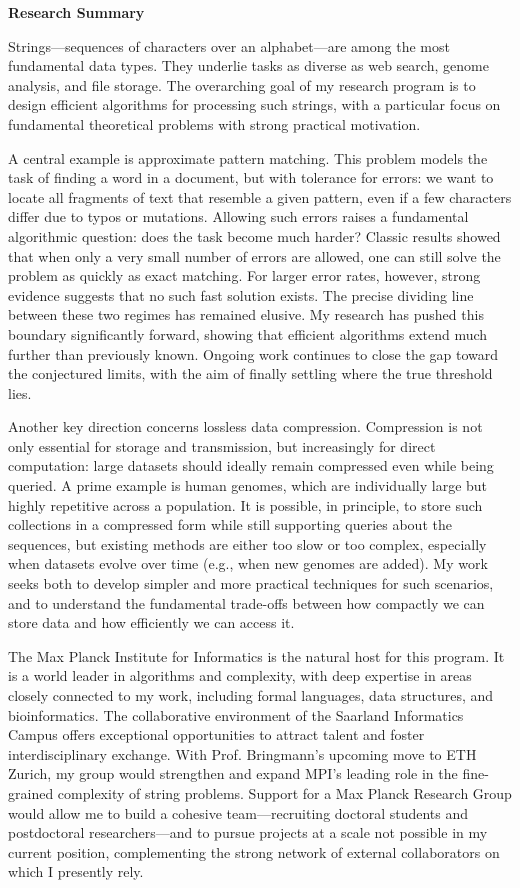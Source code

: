 \documentclass[a4paper,11pt]{article}
\begin{document}
\thispagestyle{firststyle}
\begin{center}
{\bfseries {Research Summary}}
\end{center}\vspace{-.25cm}

Strings—sequences of characters over an alphabet—are among the most fundamental data types. They underlie tasks as diverse as web search, genome analysis, and file storage. The overarching goal of my research program is to design efficient algorithms for processing such strings, with a particular focus on fundamental theoretical problems with strong practical motivation.

A central example is approximate pattern matching. This problem models the task of finding a word in a document, but with tolerance for errors: we want to locate all fragments of text that resemble a given pattern, even if a few characters differ due to typos or mutations. Allowing such errors raises a fundamental algorithmic question: does the task become much harder? Classic results showed that when only a very small number of errors are allowed, one can still solve the problem as quickly as exact matching. For larger error rates, however, strong evidence suggests that no such fast solution exists. The precise dividing line between these two regimes has remained elusive. My research has pushed this boundary significantly forward, showing that efficient algorithms extend much further than previously known. Ongoing work continues to close the gap toward the conjectured limits, with the aim of finally settling where the true threshold lies.

Another key direction concerns lossless data compression. Compression is not only essential for storage and transmission, but increasingly for direct computation: large datasets should ideally remain compressed even while being queried. A prime example is human genomes, which are individually large but highly repetitive across a population. It is possible, in principle, to store such collections in a compressed form while still supporting queries about the sequences, but existing methods are either too slow or too complex, especially when datasets evolve over time (e.g., when new genomes are added). My work seeks both to develop simpler and more practical techniques for such scenarios, and to understand the fundamental trade-offs between how compactly we can store data and how efficiently we can access it.

The Max Planck Institute for Informatics is the natural host for this program. It is a world leader in algorithms and complexity, with deep expertise in areas closely connected to my work, including formal languages, data structures, and bioinformatics. The collaborative environment of the Saarland Informatics Campus offers exceptional opportunities to attract talent and foster interdisciplinary exchange. With Prof. Bringmann’s upcoming move to ETH Zurich, my group would strengthen and expand MPI’s leading role in the fine-grained complexity of string problems. Support for a Max Planck Research Group would allow me to build a cohesive team—recruiting doctoral students and postdoctoral researchers—and to pursue projects at a scale not possible in my current position, complementing the strong network of external collaborators on which I presently rely.
\end{document}
